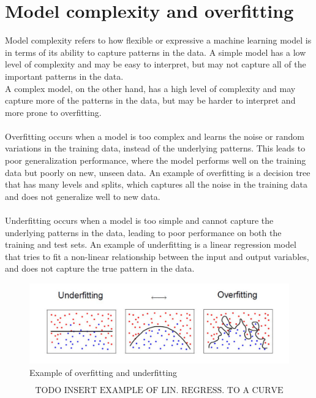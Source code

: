 \documentclass{article}
\begin{document}
\section{Model complexity and overfitting}
Model complexity refers to how flexible or expressive a machine learning model is in terms of its ability to capture patterns in the data. A simple model has a low level of complexity and may be easy to interpret, but may not capture all of the important patterns in the data.\\
A complex model, on the other hand, has a high level of complexity and may capture more of the patterns in the data, but may be harder to interpret and more prone to overfitting.\\\\
Overfitting occurs when a model is too complex and learns the noise or random variations in the training data, instead of the underlying patterns. This leads to poor generalization performance, where the model performs well on the training data but poorly on new, unseen data. An example of overfitting is a decision tree that has many levels and splits, which captures all the noise in the training data and does not generalize well to new data.\\\\
Underfitting occurs when a model is too simple and cannot capture the underlying patterns in the data, leading to poor performance on both the training and test sets. An example of underfitting is a linear regression model that tries to fit a non-linear relationship between the input and output variables, and does not capture the true pattern in the data.
\begin{figure}[!ht]
    \centering
    \includegraphics[width=\textwidth]{./images/p93_img447.png}
    \caption{Example of overfitting and underfitting}
\end{figure}

\[\text{TODO INSERT EXAMPLE OF LIN. REGRESS. TO A CURVE}\]
\newpage
\end{document}
